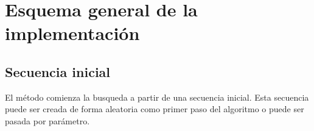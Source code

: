 % 
% 
% 
%  
% 



\section{Esquema general de la implementación}



\subsection{Secuencia inicial}

El método comienza la busqueda a partir de una secuencia inicial. 
Esta secuencia puede ser creada de forma aleatoria como primer paso del algoritmo o puede ser pasada por parámetro. 

